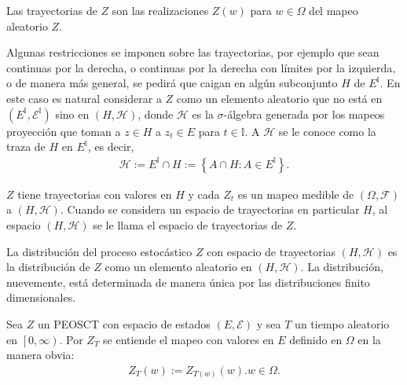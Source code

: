 \begin{Def}
Las trayectorias de $Z$ son las realizaciones $Z\left(w\right)$ para $w\in\Omega$ del mapeo aleatorio $Z$.
\end{Def}

\begin{Note}
Algunas restricciones se imponen sobre las trayectorias, por ejemplo que sean continuas por la derecha, o continuas por la derecha con l\'imites por la izquierda, o de manera m\'as general, se pedir\'a que caigan en alg\'un subconjunto $H$ de $E^{\mathbb{I}}$. En este caso es natural considerar a $Z$ como un elemento aleatorio que no est\'a en $\left(E^{\mathbb{I}},\mathcal{E}^{\mathbb{I}}\right)$ sino en $\left(H,\mathcal{H}\right)$, donde $\mathcal{H}$ es la $\sigma$-\'algebra generada por los mapeos proyecci\'on que toman a $z\in H$ a $z_{t}\in E$ para $t\in\mathbb{I}$. A $\mathcal{H}$ se le conoce como la traza de $H$ en $E^{\mathbb{I}}$, es decir,
\begin{eqnarray}
\mathcal{H}:=E^{\mathbb{I}}\cap H:=\left\{A\cap H:A\in E^{\mathbb{I}}\right\}.
\end{eqnarray}
\end{Note}


\begin{Note}
$Z$ tiene trayectorias con valores en $H$ y cada $Z_{t}$ es un mapeo medible de $\left(\Omega,\mathcal{F}\right)$ a $\left(H,\mathcal{H}\right)$. Cuando se considera un espacio de trayectorias en particular $H$, al espacio $\left(H,\mathcal{H}\right)$ se le llama el espacio de trayectorias de $Z$.
\end{Note}

\begin{Note}
La distribuci\'on del proceso estoc\'astico $Z$ con espacio de trayectorias $\left(H,\mathcal{H}\right)$ es la distribuci\'on de $Z$ como  un elemento aleatorio en $\left(H,\mathcal{H}\right)$. La distribuci\'on, nuevemente, est\'a determinada de manera \'unica por las distribuciones finito dimensionales.
\end{Note}


\begin{Def}
Sea $Z$ un PEOSCT  con espacio de estados $\left(E,\mathcal{E}\right)$ y sea $T$ un tiempo aleatorio en $\left[0,\infty\right)$. Por $Z_{T}$ se entiende el mapeo con valores en $E$ definido en $\Omega$ en la manera obvia:
\begin{eqnarray*}
Z_{T}\left(w\right):=Z_{T\left(w\right)}\left(w\right). w\in\Omega.
\end{eqnarray*}
\end{Def}

